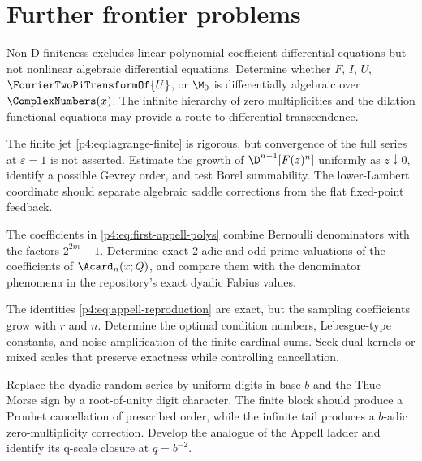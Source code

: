\documentclass[11pt]{article}
\numberwithin{equation}{section}
\theoremstyle{definition}
\theoremstyle{remark}
\begin{document}
\section{Further frontier problems}
\label{p4:sec:open}

\begin{frontieropenbox}[title=1. Differential transcendence]
Non-D-finiteness excludes linear polynomial-coefficient differential equations but not nonlinear algebraic differential equations.  Determine whether $F$, $I$, $U$, $\FourierTwoPiTransformOf{U}$, or $\M_0$ is differentially algebraic over $\ComplexNumbers(x)$.  The infinite hierarchy of zero multiplicities and the dilation functional equations may provide a route to differential transcendence.
\end{frontieropenbox}

\begin{frontieropenbox}[title=2. Convergence and resurgence of the inverse Lagrange--Bell coupling series]
The finite jet \eqref{p4:eq:lagrange-finite} is rigorous, but convergence of the full series at $\varepsilon=1$ is not asserted.  Estimate the growth of
$\D^{n-1}[F(z)^n]$ uniformly as $z\downarrow0$, identify a possible Gevrey order, and test Borel summability.  The lower-Lambert coordinate should separate algebraic saddle corrections from the flat fixed-point feedback.
\end{frontieropenbox}

\begin{frontieropenbox}[title=3. Exact two-adic denominator laws for the cardinal Appell family]
The coefficients in \eqref{p4:eq:first-appell-polys} combine Bernoulli denominators with the factors $2^{2m}-1$.  Determine exact $2$-adic and odd-prime valuations of the coefficients of $\Acard_n(x;Q)$, and compare them with the denominator phenomena in the repository's exact dyadic Fabius values.
\end{frontieropenbox}

\begin{frontieropenbox}[title=4. Stability of coarsening reproduction]
The identities \eqref{p4:eq:appell-reproduction} are exact, but the sampling coefficients grow with $r$ and $n$.  Determine the optimal condition numbers, Lebesgue-type constants, and noise amplification of the finite cardinal sums.  Seek dual kernels or mixed scales that preserve exactness while controlling cancellation.
\end{frontieropenbox}

\begin{frontieropenbox}[title=5. Base-$b$ Prouhet kernels]
Replace the dyadic random series by uniform digits in base $b$ and the Thue--Morse sign by a root-of-unity digit character.  The finite block should produce a Prouhet cancellation of prescribed order, while the infinite tail produces a $b$-adic zero-multiplicity correction.  Develop the analogue of the Appell ladder and identify its q-scale closure at $q=b^{-2}$.
\end{frontieropenbox}
\end{document}
